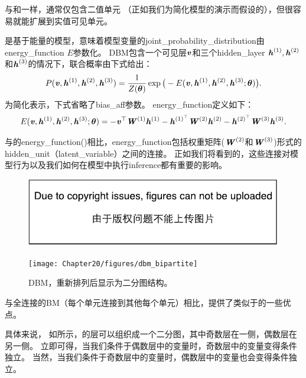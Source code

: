 与和一样，通常仅包含二值单元 （正如我们为简化模型的演示而假设的），但很容易就能扩展到实值可见单元。

是基于能量的模型，意味着模型变量的\gls{joint_probability_distribution}由\gls{energy_function} $E$参数化。
\gls{DBM}包含一个可见层$\boldsymbol{\mathit{v}}$和三个\gls{hidden_layer} $\boldsymbol{\mathit{h}}^{(1)},\boldsymbol{\mathit{h}}^{(2)}$和$\boldsymbol{\mathit{h}}^{(3)}$的情况下，联合概率由下式给出：
\begin{align}
 P(\boldsymbol{\mathit{v}}, \boldsymbol{\mathit{h}}^{(1)},  \boldsymbol{\mathit{h}}^{(2)},  \boldsymbol{\mathit{h}}^{(3)}) = \frac{1}{Z(\boldsymbol{\theta})} 
 \exp \big( -E(\boldsymbol{\mathit{v}}, \boldsymbol{\mathit{h}}^{(1)},  \boldsymbol{\mathit{h}}^{(2)},  \boldsymbol{\mathit{h}}^{(3)}; \boldsymbol{\theta}) \big).
\end{align}
为简化表示，下式省略了\gls{bias_aff}参数。
\gls{energy_function}定义如下：
\begin{align}
    E(\boldsymbol{\mathit{v}}, \boldsymbol{\mathit{h}}^{(1)}, \boldsymbol{\mathit{h}}^{(2)}, \boldsymbol{\mathit{h}}^{(3)}; \boldsymbol{\theta})  = -\boldsymbol{\mathit{v}}^\top \boldsymbol{\mathit{W}}^{(1)}\boldsymbol{\mathit{h}}^{(1)} 
 - \boldsymbol{\mathit{h}}^{(1)^\top}\boldsymbol{\mathit{W}}^{(2)}\boldsymbol{\mathit{h}}^{(2)}- \boldsymbol{\mathit{h}}^{(2)^\top}\boldsymbol{\mathit{W}}^{(3)}\boldsymbol{\mathit{h}}^{(3)}.
\end{align}

与的\gls{energy_function}()相比，\gls{energy_function}包括权重矩阵($\boldsymbol{\mathit{W}}^{(2)}$和$\boldsymbol{\mathit{W}}^{(3)}$)形式的\gls{hidden_unit}（\gls{latent_variable}）之间的连接。
正如我们将看到的，这些连接对模型行为以及我们如何在模型中执行\gls{inference}都有重要的影响。


\begin{figure}[!htb]
\ifOpenSource
\centerline{\includegraphics{figure.pdf}}
\else
\centerline{\texttt{[image: Chapter20/figures/dbm\_bipartite]}}
\fi
\caption{\gls{DBM}，重新排列后显示为二分图结构。}
\label{fig:chap20_dbm_bipartite}
\end{figure}

与全连接的\gls{BM}（每个单元连接到其他每个单元）相比，提供了类似于的一些优点。

具体来说， 如所示，的层可以组织成一个二分图，其中奇数层在一侧，偶数层在另一侧。
立即可得，当我们条件于偶数层中的变量时，奇数层中的变量变得条件独立。
当然，当我们条件于奇数层中的变量时，偶数层中的变量也会变得条件独立。

